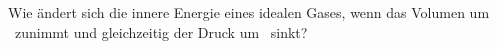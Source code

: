 Wie ändert sich die innere Energie eines idealen Gases, wenn das Volumen um \fVO\ zunimmt und gleichzeitig der Druck um \fpO\ sinkt?
